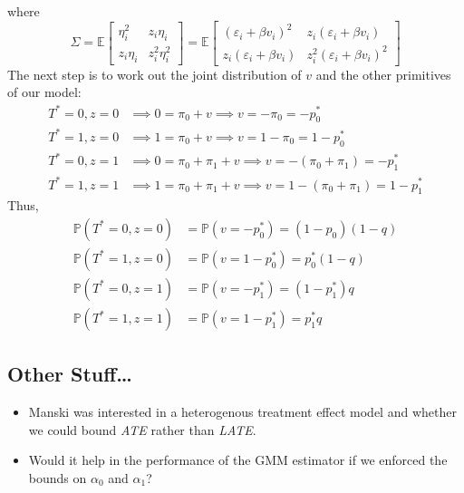 \documentclass[12pt]{article}
\begin{document}
where
\[
  \Sigma = 
  \mathbb{E}\left[
  \begin{array}{cc}
   \eta_i^2 & z_i \eta_i\\
   z_i \eta_i & z_i^2 \eta_i^2
  \end{array}
\right]
=
  \mathbb{E}\left[
  \begin{array}{cc}
   \left( \varepsilon_i + \beta v_i  \right)^2 & 
   z_i \left( \varepsilon_i + \beta v_i  \right)\\ 
   z_i \left( \varepsilon_i + \beta v_i  \right) &
   z_i^2\left( \varepsilon_i + \beta v_i  \right)^2  
  \end{array}
\right]
\]
The next step is to work out the joint distribution of $v$ and the other primitives of our model:
\begin{align*}
  T^*=0, z = 0 &\implies 0 = \pi_0 + v \implies v = -\pi_0 = -p_0^*\\
  T^*=1, z = 0 &\implies 1 = \pi_0 + v \implies v = 1-\pi_0 = 1-p_0^*\\
  T^*=0, z = 1 &\implies 0 = \pi_0 + \pi_1 + v \implies v = -(\pi_0 + \pi_1) = -p_1^*\\
  T^*=1, z = 1 &\implies 1 = \pi_0 + \pi_1 + v \implies v = 1-(\pi_0 + \pi_1) = 1-p_1^*
\end{align*}
Thus,
\begin{align*}
  \mathbb{P}(T^*=0, z = 0) &= \mathbb{P}(v = -p_0^*) = (1-p_0)(1-q)\\
  \mathbb{P}(T^*=1, z = 0) &= \mathbb{P}(v = 1-p_0^*) = p_0^*(1-q)\\
  \mathbb{P}(T^*=0, z = 1) &= \mathbb{P}(v = -p_1^*) = (1-p_1^*)q\\
  \mathbb{P}(T^*=1, z = 1) &= \mathbb{P}(v = 1-p_1^*) = p_1^* q 
\end{align*}


\subsection{Other Stuff\ldots}

\begin{itemize}
  \item Manski was interested in a heterogenous treatment effect model and whether we could bound \emph{ATE} rather than \emph{LATE}.
  \item Would it help in the performance of the GMM estimator if we enforced the bounds on $\alpha_0$ and $\alpha_1$?
\end{itemize}
\end{document}
